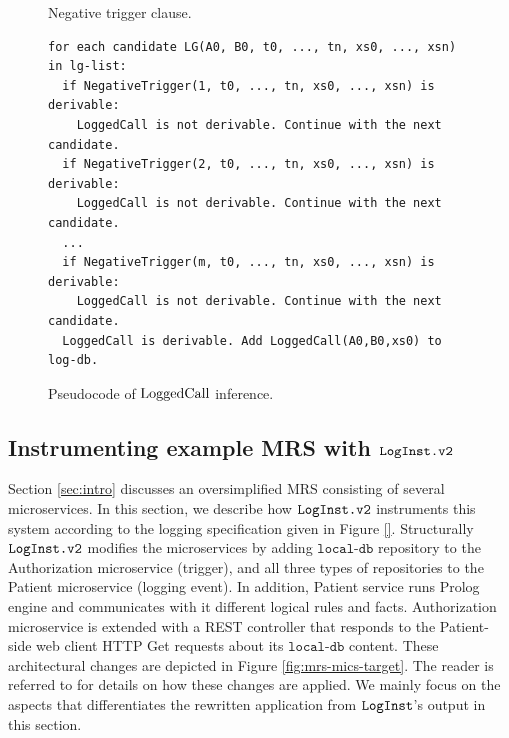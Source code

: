 \begin{figure}
\setlength{\fboxsep}{0pt}%
\caption{Negative trigger clause.} 
\label{fig:negtrigger}
\end{figure}



\begin{figure}
\begin{tiny}
\begin{Verbatim}[frame=single]
for each candidate LG(A0, B0, t0, ..., tn, xs0, ..., xsn) in lg-list:
  if NegativeTrigger(1, t0, ..., tn, xs0, ..., xsn) is derivable:
    LoggedCall is not derivable. Continue with the next candidate. 
  if NegativeTrigger(2, t0, ..., tn, xs0, ..., xsn) is derivable:
    LoggedCall is not derivable. Continue with the next candidate. 
  ...
  if NegativeTrigger(m, t0, ..., tn, xs0, ..., xsn) is derivable:
    LoggedCall is not derivable. Continue with the next candidate. 
  LoggedCall is derivable. Add LoggedCall(A0,B0,xs0) to log-db.
\end{Verbatim}
\end{tiny}
\caption{Pseudocode of $\mathrm{LoggedCall}$ inference.}
\label{fig:loggedcall}
\end{figure}





\subsection{Instrumenting example MRS with $\texttt{LogInst.v2}$} \label{sec:cstudy}
Section \ref{sec:intro} discusses an oversimplified MRS consisting of several microservices. In this section, we describe how $\texttt{LogInst.v2}$ instruments this system according to the logging specification given in Figure \ref{}. Structurally $\texttt{LogInst.v2}$ modifies the microservices by adding $\texttt{local-db}$ repository to the Authorization microservice (trigger), and all three types of repositories to the Patient microservice (logging event). In addition, Patient service runs Prolog engine and communicates with it different logical rules and facts. Authorization microservice is extended with a REST controller that responds to the Patient-side web client HTTP Get requests about its $\texttt{local-db}$ content. These architectural changes are depicted in Figure \ref{fig:mrs-mics-target}. The reader is referred to \cite{} for details on how these changes are applied. We mainly focus on the aspects that differentiates the rewritten application from $\texttt{LogInst}$'s output in this section. 

